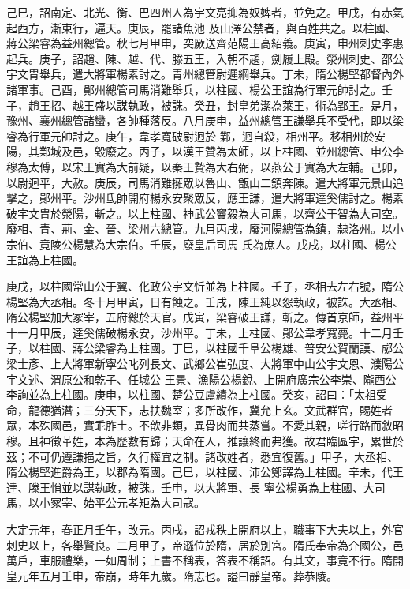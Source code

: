 \begin{pinyinscope}
 己巳，詔南定、北光、衡、巴四州人為宇文亮抑為奴婢者，並免之。甲戌，有赤氣起西方，漸東行，遍天。庚辰，罷諸魚池
 及山澤公禁者，與百姓共之。以柱國、蔣公梁睿為益州總管。秋七月甲申，突厥送齊范陽王高紹義。庚寅，申州刺史李惠起兵。庚子，詔趙、陳、越、代、滕五王，入朝不趨，劍履上殿。滎州刺史、邵公宇文胄舉兵，遣大將軍楊素討之。青州總管尉遲綱舉兵。丁未，隋公楊堅都督內外諸軍事。己酉，鄖州總管司馬消難舉兵，以柱國、楊公王誼為行軍元帥討之。壬子，趙王招、越王盛以謀執政，被誅。癸丑，封皇弟潔為萊王，術為郢王。是月，豫州、襄州總管諸蠻，各帥種落反。八月庚申，益州總管王謙舉兵不受代，即以梁睿為行軍元帥討之。庚午，韋孝寬破尉迥於
 鄴，迥自殺，相州平。移相州於安陽，其鄴城及邑，毀廢之。丙子，以漢王贊為太師，以上柱國、並州總管、申公李穆為太傅，以宋王實為大前疑，以秦王贄為大右弼，以燕公于實為大左輔。己卯，以尉迥平，大赦。庚辰，司馬消難擁眾以魯山、甑山二鎮奔陳。遣大將軍元景山追擊之，鄖州平。沙州氐帥開府楊永安聚眾反，應王謙，遣大將軍達奚儒討之。楊素破宇文胄於滎陽，斬之。以上柱國、神武公竇毅為大司馬，以齊公于智為大司空。廢相、青、荊、金、晉、梁州六總管。九月丙戌，廢河陽總管為鎮，隸洛州。以小宗伯、竟陵公楊慧為大宗伯。壬辰，廢皇后司馬
 氏為庶人。戊戌，以柱國、楊公王誼為上柱國。



 庚戌，以柱國常山公于翼、化政公宇文忻並為上柱國。壬子，丞相去左右號，隋公楊堅為大丞相。冬十月甲寅，日有蝕之。壬戌，陳王純以怨執政，被誅。大丞相、隋公楊堅加大冢宰，五府總於天官。戊寅，梁睿破王謙，斬之。傳首京師，益州平十一月甲辰，達奚儒破楊永安，沙州平。丁未，上柱國、鄖公韋孝寬薨。十二月壬子，以柱國、蔣公梁睿為上柱國。丁巳，以柱國千阜公楊雄、普安公賀蘭謨、郕公梁士彥、上大將軍新寧公叱列長文、武鄉公崔弘度、大將軍中山公宇文恩、濮陽公宇文述、渭原公和乾子、任城公
 王景、漁陽公楊銳、上開府廣宗公李崇、隴西公李詢並為上柱國。庚申，以柱國、楚公豆盧績為上柱國。癸亥，詔曰：「太祖受命，龍德猶潛；三分天下，志扶魏室；多所改作，冀允上玄。文武群官，賜姓者眾，本殊國邑，實乖胙土。不歆非類，異骨肉而共蒸嘗。不愛其親，嗟行路而敘昭穆。且神徵革姓，本為歷數有歸；天命在人，推讓終而弗獲。故君臨區宇，累世於茲；不可仍遵謙挹之旨，久行權宜之制。諸改姓者，悉宜復舊。」甲子，大丞相、隋公楊堅進爵為王，以郡為隋國。己巳，以柱國、沛公鄭譯為上柱國。辛未，代王達、滕王悄並以謀執政，被誅。壬申，以大將軍、長
 寧公楊勇為上柱國、大司馬，以小冢宰、始平公元孝矩為大司寇。



 大定元年，春正月壬午，改元。丙戌，詔戎秩上開府以上，職事下大夫以上，外官刺史以上，各舉賢良。二月甲子，帝遜位於隋，居於別宮。隋氏奉帝為介國公，邑萬戶，車服禮樂，一如周制；上書不稱表，答表不稱詔。有其文，事竟不行。隋開皇元年五月壬申，帝崩，時年九歲。隋志也。謚曰靜皇帝。葬恭陵。




\end{pinyinscope}
